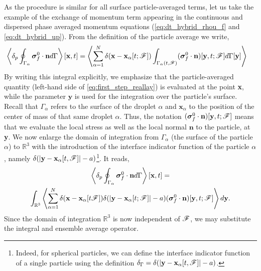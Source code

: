 As the procedure is similar for all surface particle-averaged terms, let us take the example of the exchange of momentum term appearing in the continuous and dispersed phase averaged momentum equations (\ref{eq:dt_hybrid_rhou_f} and \ref{eq:dt_hybrid_up}). 
From the definition of the particle average we write,
\begin{align}
    \pSavg{\bm\sigma_f^0\cdot\textbf{n}}[\textbf{x},t]
    &= \avg{ \sum_{\alpha=1}^N \delta(\textbf{x}-\textbf{x}_\alpha[t; \FF])
    \int_{\Gamma_\alpha(t,\FF)}
    (\bm\sigma_f^0\cdot\textbf{n})[\textbf{y},t;\FF]
    d\Gamma[\textbf{y}] }
    \label{eq:first_step_reallay}
\end{align}
By writing this integral explicitly, we emphasize that the particle-averaged quantity (left-hand side of \ref{eq:first_step_reallay}) is evaluated at the point \textbf{x}, while the parameter $\textbf{y}$ is used for the integration over the particle's surface.
Recall that $\Gamma_\alpha$ refers to the surface of the droplet $\alpha$ and $\textbf{x}_\alpha$ to the position of the center of mass of that same droplet $\alpha$. 
Thus, the notation $(\bm\sigma_f^0\cdot\textbf{n})[\textbf{y},t;\mathscr{F}]$ means that we evaluate the local stress as well as the local normal $\textbf{n}$ to the particle, at \textbf{y}. 
We now enlarge the domain of integration from $\Gamma_\alpha$ (the surface of the particle $\alpha$) to $\mathbb{R}^3$ with the introduction of the interface indicator function of the particle $\alpha$, namely $\delta(|\textbf{y} - \textbf{x}_\alpha[t,\mathscr{F}]| - a)$\footnote{Indeed, for spherical particles, we can define the interface indicator function of a single particle using the definition $\delta_\Gamma = \delta(|\textbf{y} - \textbf{x}_\alpha[t,\mathscr{F}]| - a)$.}. 
It reads,
\begin{multline}
    \pSavg{\bm\sigma_f^0\cdot\textbf{n}}[\textbf{x},t]
    = \\
    \int_{\mathbb{R}^3}
    \avg{
     \sum_{\alpha=1}^N 
     \delta(\textbf{x}-\textbf{x}_\alpha[t \FF])
    \delta(|\textbf{y} - \textbf{x}_{\alpha}[t;\FF]|-a)
    (\bm\sigma_f^0\cdot\textbf{n})[\textbf{y},t;\FF]
    }
    d\textbf{y}. 
    \label{eq:first_step_drag}
\end{multline} 
Since the domain of integration $\mathbb{R}^3$ is now independent of $\mathscr{F}$, we may substitute the integral and ensemble average operator. 

